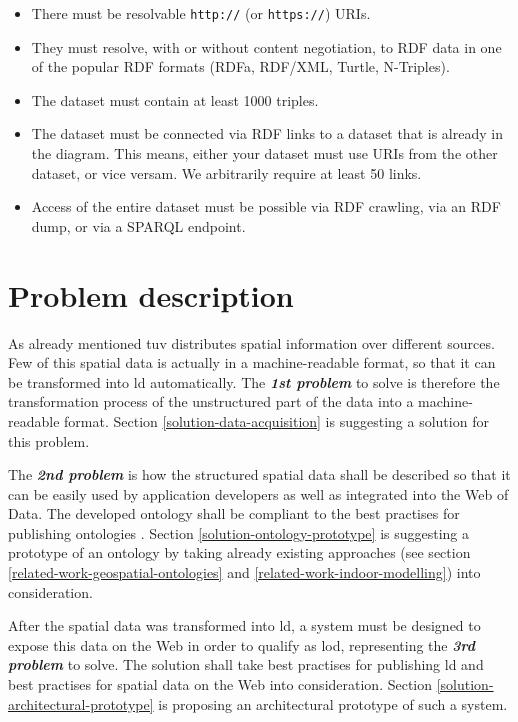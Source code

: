 \documentclass[draft,final]{vutinfth} %
\begin{document}
\begin{itemize}
	\item There must be resolvable \texttt{http://} (or \texttt{https://}) URIs.
	\item They must resolve, with or without content negotiation, to RDF data in one of the popular RDF formats (RDFa, RDF/XML, Turtle, N-Triples).
	\item The dataset must contain at least 1000 triples.
	\item The dataset must be connected via RDF links to a dataset that is already in the diagram. This means, either your dataset must use URIs from the other dataset, or vice versam. We arbitrarily require at least 50 links.
	\item Access of the entire dataset must be possible via RDF crawling, via an RDF dump, or via a SPARQL endpoint.
\end{itemize}


\section{Problem description}
\label{intro-problem-description}

As already mentioned \gls{tuv} distributes spatial information over different sources. Few of this spatial data is actually in a machine-readable format, so that it can be transformed into \gls{ld} automatically. The \textbf{\textit{1st problem}} to solve is therefore the transformation process of the unstructured part of the data into a machine-readable format. Section \ref{solution-data-acquisition} is suggesting a solution for this problem.

The \textbf{\textit{2nd problem}} is how the structured spatial data shall be described so that it can be easily used by application developers as well as integrated into the Web of Data. The developed ontology shall be compliant to the best practises for publishing ontologies \cite{berrueta_best_2008}. Section \ref{solution-ontology-prototype} is suggesting a prototype of an ontology by taking already existing approaches (see section \ref{related-work-geospatial-ontologies} and \ref{related-work-indoor-modelling}) into consideration.

After the spatial data was transformed into \gls{ld}, a system must be designed to expose this data on the Web in order to qualify as \gls{lod}, representing the \textbf{\textit{3rd problem}} to solve. The solution shall take best practises for publishing \gls{ld}\cite{hyland_best_2014} and best practises for spatial data on the Web\cite{tandy_spatial_2016} into consideration. Section \ref{solution-architectural-prototype} is proposing an architectural prototype of such a system.
\end{document}
